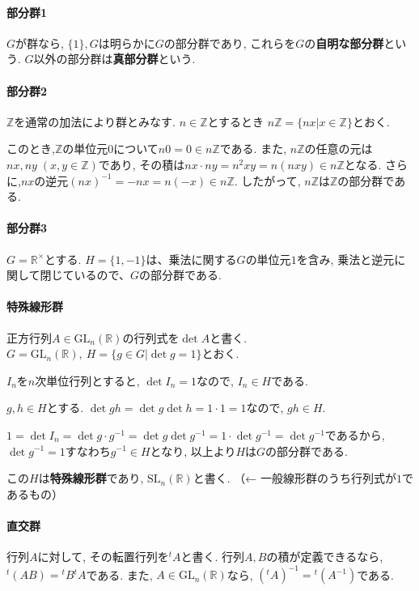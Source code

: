 \paragraph*{部分群1}
$G$が群なら, $\{1\},G$は明らかに$G$の部分群であり,
これらを$G$の\textbf{自明な部分群}という.
$G$以外の部分群は\textbf{真部分群}という.\\

\paragraph*{部分群2}
$\mathbb{Z}$を通常の加法により群とみなす.
$n\in \mathbb{Z}$とするとき
$n\mathbb{Z} = \{nx | x\in \mathbb{Z}\}$とおく.

このとき,$\mathbb{Z}$の単位元$0$について$n0=0 \in n\mathbb{Z}$である.
また, $n\mathbb{Z}$の任意の元は$nx,ny \;(x,y \in \mathbb{Z})$であり,
その積は$nx\cdot ny=n^2xy=n(nxy) \in n\mathbb{Z}$となる.
さらに,$nx$の逆元$(nx)^{-1}=-nx=n(-x) \in n\mathbb{Z}$.
したがって, $n\mathbb{Z}$は$\mathbb{Z}$の部分群である.\\

\paragraph*{部分群3}
$G=\mathbb{R}^\times$とする.
$H=\{1,-1\}$は、乗法に関する$G$の単位元$1$を含み,
乗法と逆元に関して閉じているので、$G$の部分群である. \\

\paragraph*{特殊線形群}
正方行列$A\in \mathrm{GL}_n(\mathbb{R})$の行列式を$\det{A}$と書く.
$G=\mathrm{GL}_n(\mathbb{R}),\: H=\{g \in G | \det{g} =1\} $とおく.

$I_n$を$n$次単位行列とすると, $\det I_n = 1$なので, $ I_n \in H$である.

$g,h \in H $とする.
$\det{gh}=\det{g}\det{h}=1\cdot 1=1$なので, $gh \in H$.

$1=\det{I_n}=\det{g\cdot g^{-1}}=\det{g}\det{g^{-1}}=1\cdot \det{g^{-1}}=\det{g^{-1}}$であるから, 
$\det{g^{-1}} =1 $すなわち$ g^{-1} \in H$となり,
以上より$H$は$G$の部分群である.

この$H$は\textbf{特殊線形群}であり, $\mathrm{SL}_n(\mathbb{R})$と書く.
（← 一般線形群のうち行列式が$1$であるもの）\\

\paragraph*{直交群}
行列$A$に対して, その転置行列を${}^tA$と書く.
行列$A,B$の積が定義できるなら, ${}^t(AB)={}^tB{}^tA$である.
また, $A \in \mathrm{GL}_n(\mathbb{R})$なら, 
$({}^t A)^{-1} = {}^t(A^{-1})$である.

